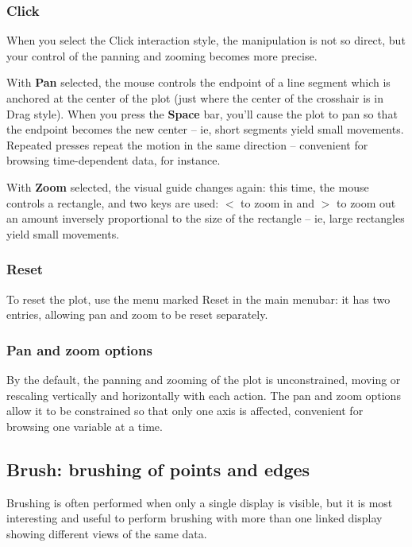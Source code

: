 \documentclass[11pt]{article}
\begin{document}
\subsubsection{Click}

When you select the Click interaction style, the manipulation is
not so direct, but your control of the panning and zooming becomes
more precise.

With {\bf Pan} selected, the mouse controls the endpoint of a line
segment which is anchored at the center of the plot (just where the
center of the crosshair is in Drag style).  When you press the {\bf
Space} bar, you'll cause the plot to pan so that the endpoint becomes
the new center -- ie, short segments yield small movements.  Repeated
presses repeat the motion in the same direction -- convenient for
browsing time-dependent data, for instance.

With {\bf Zoom} selected, the visual guide changes again: this time,
the mouse controls a rectangle, and two keys are used: {\boldmath $<$}
to zoom in and {\boldmath $>$} to zoom out an amount inversely
proportional to the size of the rectangle -- ie, large rectangles
yield small movements.

\subsubsection{Reset}

To reset the plot, use the menu marked Reset in the main menubar:
it has two entries, allowing pan and zoom to be reset separately.

\subsubsection{Pan and zoom options}

By the default, the panning and zooming of the plot is unconstrained,
moving or rescaling vertically and horizontally with each action.
The pan and zoom options allow it to be constrained so that only
one axis is affected, convenient for browsing one variable at a time.

\subsection{Brush: brushing of points and edges}
\label{slbl:Brush}

Brushing is often performed when only a single display is visible,
but it is most interesting and useful to perform brushing with more
than one linked display showing different views of the same data.  
\end{document}
